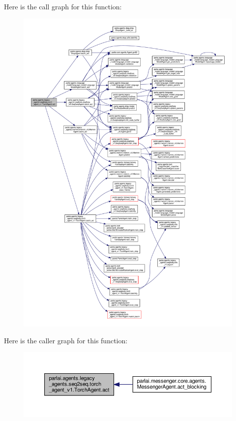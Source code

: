 Here is the call graph for this function\+:
\nopagebreak
\begin{figure}[H]
\begin{center}
\leavevmode
\includegraphics[width=350pt]{classparlai_1_1agents_1_1legacy__agents_1_1seq2seq_1_1torch__agent__v1_1_1TorchAgent_a3ab251071823f34358a569c1c2a11bf9_cgraph}
\end{center}
\end{figure}
Here is the caller graph for this function\+:
\nopagebreak
\begin{figure}[H]
\begin{center}
\leavevmode
\includegraphics[width=350pt]{classparlai_1_1agents_1_1legacy__agents_1_1seq2seq_1_1torch__agent__v1_1_1TorchAgent_a3ab251071823f34358a569c1c2a11bf9_icgraph}
\end{center}
\end{figure}
